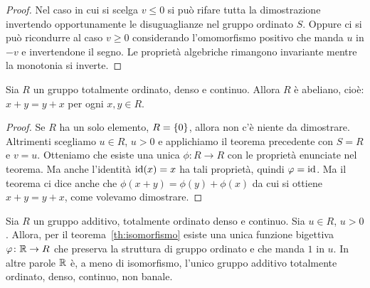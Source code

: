 \begin{proof}
Nel caso in cui si scelga $v\le 0$ si può rifare tutta la dimostrazione 
invertendo opportunamente le disuguaglianze nel gruppo ordinato $S$.
Oppure ci si può ricondurre al caso $v\ge 0$ considerando l'omomorfismo 
positivo che manda $u$ in $-v$ e invertendone il segno.
Le proprietà algebriche rimangono invariante mentre la monotonia si inverte.
\end{proof}

\begin{theorem}[commutatività]
  Sia $R$ un gruppo totalmente ordinato, denso e continuo. 
  Allora $R$ è abeliano, cioè: $x+y=y+x$ per ogni $x,y\in R$.
\end{theorem}
%
\begin{proof}
Se $R$ ha un solo elemento, $R={\left\{ 0 \right\}}$, allora non c'è niente da dimostrare.
Altrimenti scegliamo $u\in R$, $u>0$ e applichiamo il teorema precedente 
con $S=R$ e $v=u$. 
Otteniamo che esiste una unica $\phi\colon R\to R$ con le proprietà 
enunciate nel teorema. 
Ma anche l'identità $\mathrm{id}(x)=x$ ha tali proprietà, quindi $\varphi =\mathrm{id}$.
Ma il teorema ci dice anche che $\phi(x+y) = \phi(y)+\phi(x)$ da cui si ottiene
$x+y=y+x$, come volevamo dimostrare.
\end{proof}

\begin{corollary}
  Sia $R$ un gruppo additivo, totalmente ordinato denso e continuo.
  Sia $u\in R$, $u>0$.
  Allora, per il teorema~\ref{th:isomorfismo} 
  esiste una unica funzione bigettiva $\varphi \colon {\mathbb R}\to R$ 
  che preserva la struttura di gruppo ordinato e che manda $1$ in $u$.
  In altre parole ${\mathbb R}$ è, a meno di isomorfismo, 
  l'unico gruppo additivo totalmente ordinato, denso, continuo, non banale.
\end{corollary}

